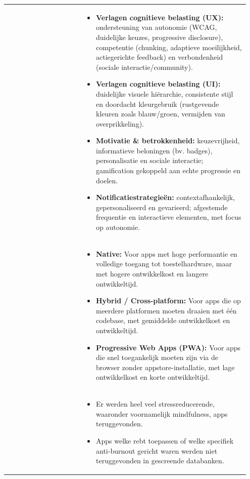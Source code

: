 {\begin{longtable}{>{\raggedright\arraybackslash}p{0.30\linewidth} >{\raggedright\arraybackslash}p{0.65\linewidth}}
        \nameref{sec:ux-ontwerp} &
        \begin{itemize}[nosep, leftmargin=*]
            \item \textbf{Verlagen cognitieve belasting (UX):} ondersteuning van autonomie (WCAG, duidelijke keuzes, progressive disclosure), competentie (chunking, adaptieve moeilijkheid, actiegerichte feedback) en verbondenheid (sociale interactie/community).
            \item \textbf{Verlagen cognitieve belasting (UI):} duidelijke visuele hiërarchie, consistente stijl en doordacht kleurgebruik (rustgevende kleuren zoals blauw/groen, vermijden van overprikkeling).
            \item \textbf{Motivatie \& betrokkenheid:} keuzevrijheid, informatieve beloningen (bv. badges), personalisatie en sociale interactie; gamification gekoppeld aan echte progressie en doelen.
            \item \textbf{Notificatiestrategieën:} contextafhankelijk, gepersonaliseerd en gevarieerd; afgestemde frequentie en interactieve elementen, met focus op autonomie.
        \end{itemize} \\
        \addlinespace[8pt]
        
        \nameref{sec:technologieselectie} &
        \begin{itemize}[nosep, leftmargin=*]
            \item \textbf{Native:} Voor apps met hoge performantie en volledige toegang tot toestelhardware, maar met hogere ontwikkelkost en langere ontwikkeltijd.
            
            \item \textbf{Hybrid / Cross-platform:} Voor apps die op meerdere platformen moeten draaien met één codebase, met gemiddelde ontwikkelkost en ontwikkeltijd.
            
            \item \textbf{Progressive Web Apps (PWA):} Voor apps die snel toegankelijk moeten zijn via de browser zonder appstore-installatie, met lage ontwikkelkost en korte ontwikkeltijd.
        \end{itemize} \\
        
        \nameref{sec:longlist} &
        \begin{itemize}[nosep, leftmargin=*]
            \item Er werden heel veel stressreducerende, waaronder voornamelijk mindfulness, apps teruggevonden.
            \item Apps welke \acrshort{rebt} toepassen of welke specifiek anti-burnout gericht waren werden niet teruggevonden in gescreende databanken.
        \end{itemize} \\
        
    \end{longtable}
}

